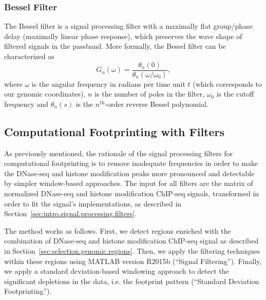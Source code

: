 \subsubsection{Bessel Filter}
\label{sec:bessel.filter}

The Bessel filter is a signal processing filter with a maximally flat group/phase delay (maximally linear phase response), which preserves the wave shape of filtered signals in the passband. More formally, the Bessel filter can be characterized as
\begin{equation}
  \label{eq:bessel1}
  G_n(\omega) = \frac{\theta_n(0)}{\theta_n(\omega/\omega_0)},
\end{equation}
where $ \omega $ is the angular frequency in radians per time unit $ t $ (which corresponds to our genomic coordinates), $n$ is the number of poles in the filter, $ \omega_0 $ is the cutoff frequency and $ \theta_n(s) $ is the $n^{\text{th}}$-order reverse Bessel polynomial.

\subsection{Computational Footprinting with Filters}
\label{sec:computational.footprinting.filters}

As previously mentioned, the rationale of the signal processing filters for computational footprinting is to remove inadequate frequencies in order to make the DNase-seq and histone modification peaks more pronounced and detectable by simpler window-based approaches. The input for all filters are the matrix of normalized DNase-seq and histone modification ChIP-seq signals, transformed in order to fit the signal's implementations, as described in Section~\ref{sec:intro.signal.processing.filters}.

The method works as follows. First, we detect regions enriched with the combination of DNase-seq and histone modification ChIP-seq signal as described in Section~\ref{sec:selection.genomic.regions}. Then, we apply the filtering techniques within these regions using MATLAB version R2015b (``Signal Filtering''). Finally, we apply a standard deviation-based windowing approach to detect the significant depletions in the data, i.e. the footprint pattern (``Standard Deviation Footprinting'').

